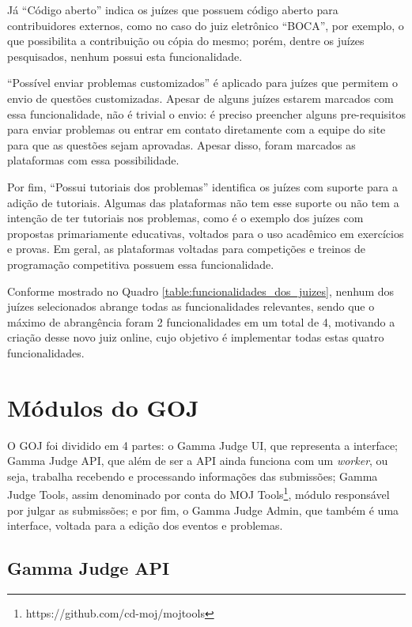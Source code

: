 Já ``Código aberto'' indica os juízes que possuem código aberto para contribuidores externos, como no caso do juiz eletrônico “BOCA”, por exemplo, o que possibilita a contribuição ou cópia do mesmo; porém, dentre os juízes pesquisados, nenhum possui esta funcionalidade. 

``Possível enviar problemas customizados'' é aplicado para juízes que permitem o envio de questões customizadas. Apesar de alguns juízes estarem marcados com essa funcionalidade, não é trivial o envio: é preciso preencher alguns pre-requisitos para enviar problemas ou entrar em contato diretamente com a equipe do site para que as questões sejam aprovadas. Apesar disso, foram marcados as plataformas com essa possibilidade. 

Por fim, ``Possui tutoriais dos problemas'' identifica os juízes com suporte para a adição de tutoriais. Algumas das plataformas não tem esse suporte ou não tem a intenção de ter tutoriais nos problemas, como é o exemplo dos juízes com propostas primariamente educativas, voltados para o uso acadêmico em exercícios e provas. Em geral, as plataformas voltadas para competições e treinos de programação competitiva possuem essa funcionalidade.
 
Conforme mostrado no Quadro \ref{table:funcionalidades_dos_juizes}, nenhum dos juízes selecionados abrange todas as funcionalidades relevantes, sendo que o máximo de abrangência foram 2 funcionalidades em um total de 4, motivando a criação desse novo juiz online, cujo objetivo é implementar todas estas quatro funcionalidades.
 
\section{Módulos do GOJ}
\label{sec:modulosDaAplicacao}

O GOJ foi dividido em 4 partes: o Gamma Judge UI, que representa a interface; Gamma Judge API, que além de ser a API ainda funciona com um \textit{worker}, ou seja, trabalha recebendo e processando informações das submissões;  Gamma Judge Tools, assim denominado por conta do MOJ Tools\footnote{https://github.com/cd-moj/mojtools}, módulo responsável por julgar as submissões; e por fim, o Gamma Judge Admin, que também é uma interface, voltada para a edição dos eventos e problemas.

\subsection{Gamma Judge API}
\label{sec:gammaJudgeApi}


